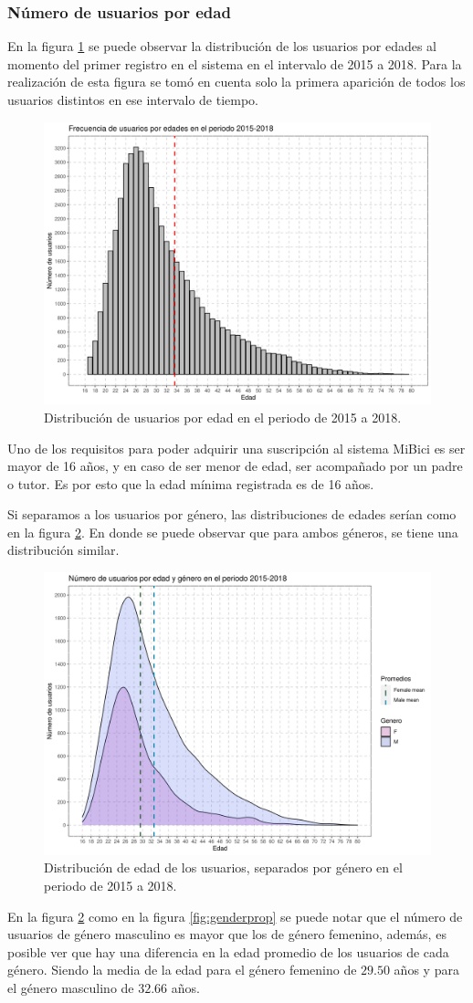 \subsubsection*{Número de usuarios por edad}
En la figura \ref{fig:agedistribution} se puede observar la distribución de los usuarios por edades al momento del primer registro en el sistema en el intervalo de 2015 a 2018. Para la realización de esta figura se tomó en cuenta solo la primera aparición de todos los usuarios distintos en ese intervalo de tiempo.
\begin{figure}[H]
	\centering
	\includegraphics[width=0.7\linewidth]{Graphics/age_distribution}
	\caption{Distribución de usuarios por edad en el periodo de 2015 a 2018.}
	\label{fig:agedistribution}
\end{figure}

Uno de los requisitos para poder adquirir una suscripción al sistema MiBici es ser mayor de 16 años, y en caso de ser menor de edad, ser acompañado por un padre o tutor. Es por esto que la edad mínima registrada es de 16 años.
\par Si separamos a los usuarios por género, las distribuciones de edades serían como en la figura \ref{fig:agegenderdistribution}. En donde se puede observar que para ambos géneros, se tiene una distribución similar.
\begin{figure}[H]
	\centering
	\includegraphics[width=0.7\linewidth]{Graphics/age_gender_distribution}
	\caption{Distribución de edad de los usuarios, separados por género en el periodo de 2015 a 2018.}
	\label{fig:agegenderdistribution}
\end{figure}
En la figura \ref{fig:agegenderdistribution} como en la figura \ref{fig:genderprop} se puede notar que el número de usuarios de género masculino es mayor que los de género femenino, además, es posible ver que hay una diferencia en la edad promedio de los usuarios de cada género. Siendo la media de la edad para el género femenino de $29.50$ años y para el género masculino de $32.66$ años. 